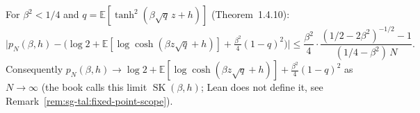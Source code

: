 \begin{theorem}\label{thm:sg-tal:alr}
  \leanok
{}
For $\beta^2<1/4$ and $q=\mathbb{E}[\tanh^2(\beta\sqrt q\,z+h)]$ (Theorem~1.4.10):
\[
\Big|p_N(\beta, h) - \Big(\log2+\mathbb{E}[\log\cosh(\beta z\sqrt q+h)]+\tfrac{\beta^2}{4}(1-q)^2\Big)\Big| \le \frac{\beta^2}{4}\cdot\frac{(1/2-2\beta^2)^{-1/2}-1}{(1/4-\beta^2)\,N}.
\]
Consequently $p_N(\beta,h)\to \log2+\mathbb{E}[\log\cosh(\beta z\sqrt q+h)]+\frac{\beta^2}{4}(1-q)^2$ as $N\to\infty$ (the book calls this limit $\operatorname{SK}(\beta,h)$; Lean does not define it, see Remark~\ref{rem:sg-tal:fixed-point-scope}).
\end{theorem}
